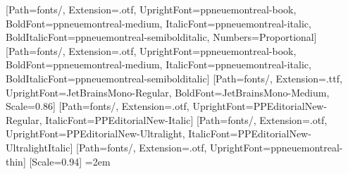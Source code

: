 \usepackage[letterpaper, top=1.0in, bottom=1.0in, left=1.0in, right=1.0in, headsep=0.35in, footskip=0.45in]{geometry}
\usepackage{amsmath}
\usepackage{fontspec}
\usepackage{unicode-math}
\usepackage{xcolor}
\usepackage{graphicx}
\usepackage{tikz}
\usetikzlibrary{positioning, calc, arrows.meta, shapes.misc, fit, backgrounds}
\usepackage[most]{tcolorbox}
\usepackage{luacolor}
\usepackage{lua-ul}
\usepackage{booktabs, tabularx, array, multirow}
\usepackage{enumitem}
\usepackage{titlesec}
\usepackage{fancyhdr}
\usepackage{caption, subcaption}
\usepackage{microtype}
\usepackage{float}
\usepackage[section,above,below]{placeins}
\usepackage[numbers, sort&compress]{natbib}
\usepackage{hyperref}
\usepackage{etoolbox}

\setmainfont{PP Neue Montreal}[Path=fonts/, Extension=.otf, UprightFont=ppneuemontreal-book,
  BoldFont=ppneuemontreal-medium, ItalicFont=ppneuemontreal-italic, BoldItalicFont=ppneuemontreal-semibolditalic,
  Numbers=Proportional]
\setsansfont{PP Neue Montreal}[Path=fonts/, Extension=.otf, UprightFont=ppneuemontreal-book,
  BoldFont=ppneuemontreal-medium, ItalicFont=ppneuemontreal-italic, BoldItalicFont=ppneuemontreal-semibolditalic]
\setmonofont{JetBrains Mono}[Path=fonts/, Extension=.ttf, UprightFont=JetBrainsMono-Regular,
  BoldFont=JetBrainsMono-Medium, Scale=0.86]
\newfontfamily{}[Path=fonts/, Extension=.otf, UprightFont=PPEditorialNew-Regular,
  ItalicFont=PPEditorialNew-Italic]
\newfontfamily{}[Path=fonts/, Extension=.otf,
  UprightFont=PPEditorialNew-Ultralight, ItalicFont=PPEditorialNew-UltralightItalic]
\newfontfamily{}[Path=fonts/, Extension=.otf, UprightFont=ppneuemontreal-thin]
[Scale=0.94]
\linespread{1.2}
\setlength{\parindent}{0pt}
\setlength{\parskip}{0.62em}
\frenchspacing
\emergencystretch=2em

\color{ink}

